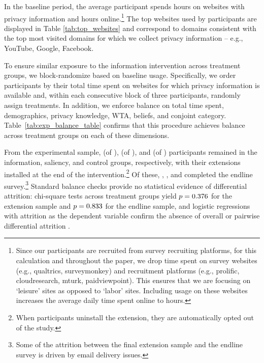 \documentclass[12pt]{article}
\theoremstyle{definition}
\theoremstyle{remark}
\begin{document}
In the baseline period, the average participant spends \baselineDailyHoursPrivacy{} hours on websites with privacy information and \baselineDailyHoursLeisure{} hours online.\footnote{Since our participants are recruited from survey recruiting platforms, for this calculation and throughout the paper, we drop time spent on survey websites (e.g., qualtrics, surveymonkey) and recruitment platforms (e.g., prolific, cloudresearch, mturk, paidviewpoint). This ensures that we are focusing on `leisure' sites as opposed to `labor' sites. Including usage on these websites increases the average daily time spent online to \baselineDailyHoursAll{} hours.} The top websites used by participants are displayed in Table \ref{tab:top_websites} and correspond to domains consistent with the top most visited domains for which we collect privacy information -- e.g., YouTube, Google,  Facebook.

To ensure similar exposure to the information intervention across treatment groups, we block-randomize based on baseline usage. Specifically, we order participants by their total time spent on websites for which privacy information is available and, within each consecutive block of three participants, randomly assign treatments. In addition, we enforce balance on total time spent, demographics, privacy knowledge, WTA, beliefs, and conjoint category. Table~\ref{tab:exp_balance_table} confirms that this procedure achieves balance across treatment groups on each of these dimensions.

From the experimental sample, \extensionInfoFinalN{} (of \extensionInfoStartN{}), \extensionSaliencyFinalN{} (of \extensionSaliencyStartN{}), and \extensionControlFinalN{} (of \extensionControlStartN{}) participants remained in the information, saliency, and control groups, respectively, with their extensions installed at the end of the intervention.\footnote{When participants uninstall the extension, they are automatically opted out of the study.} Of these, \surveyEndlineInfoN{}, \surveyEndlineSaliencyN{}, and \surveyEndlineControlN{} completed the endline survey.\footnote{Some of the attrition between the final extension sample and the endline survey is driven by email delivery issues.} Standard balance checks provide no statistical evidence of differential attrition: chi-square tests across treatment groups yield $p = 0.376{}$ for the extension sample and $p = 0.833{}$ for the endline sample, and logistic regressions with attrition as the dependent variable confirm the absence of overall or pairwise differential attrition \citep{gerber2012field}.
\end{document}
